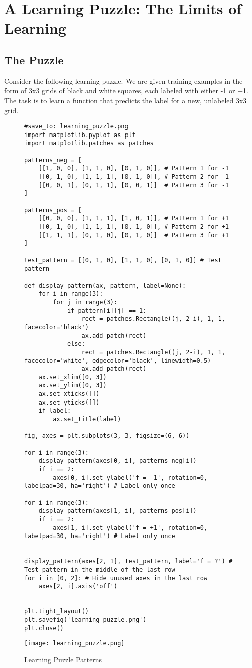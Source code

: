 \documentclass{article}
\begin{document}
\section{A Learning Puzzle: The Limits of Learning}
\subsection{The Puzzle}
Consider the following learning puzzle. We are given training examples in the form of 3x3 grids of black and white squares, each labeled with either -1 or +1. The task is to learn a function that predicts the label for a new, unlabeled 3x3 grid.

\begin{figure}[H]
    \centering
    \begin{verbatim}
#save_to: learning_puzzle.png
import matplotlib.pyplot as plt
import matplotlib.patches as patches

patterns_neg = [
    [[1, 0, 0], [1, 1, 0], [0, 1, 0]], # Pattern 1 for -1
    [[0, 1, 0], [1, 1, 1], [0, 1, 0]], # Pattern 2 for -1
    [[0, 0, 1], [0, 1, 1], [0, 0, 1]]  # Pattern 3 for -1
]

patterns_pos = [
    [[0, 0, 0], [1, 1, 1], [1, 0, 1]], # Pattern 1 for +1
    [[0, 1, 0], [1, 1, 1], [0, 1, 0]], # Pattern 2 for +1
    [[1, 1, 1], [0, 1, 0], [0, 1, 0]]  # Pattern 3 for +1
]

test_pattern = [[0, 1, 0], [1, 1, 0], [0, 1, 0]] # Test pattern

def display_pattern(ax, pattern, label=None):
    for i in range(3):
        for j in range(3):
            if pattern[i][j] == 1:
                rect = patches.Rectangle((j, 2-i), 1, 1, facecolor='black')
                ax.add_patch(rect)
            else:
                rect = patches.Rectangle((j, 2-i), 1, 1, facecolor='white', edgecolor='black', linewidth=0.5)
                ax.add_patch(rect)
    ax.set_xlim([0, 3])
    ax.set_ylim([0, 3])
    ax.set_xticks([])
    ax.set_yticks([])
    if label:
        ax.set_title(label)

fig, axes = plt.subplots(3, 3, figsize=(6, 6))

for i in range(3):
    display_pattern(axes[0, i], patterns_neg[i])
    if i == 2:
        axes[0, i].set_ylabel('f = -1', rotation=0, labelpad=30, ha='right') # Label only once

for i in range(3):
    display_pattern(axes[1, i], patterns_pos[i])
    if i == 2:
        axes[1, i].set_ylabel('f = +1', rotation=0, labelpad=30, ha='right') # Label only once


display_pattern(axes[2, 1], test_pattern, label='f = ?') # Test pattern in the middle of the last row
for i in [0, 2]: # Hide unused axes in the last row
    axes[2, i].axis('off')


plt.tight_layout()
plt.savefig('learning_puzzle.png')
plt.close()
    \end{verbatim}
    \texttt{[image: learning\_puzzle.png]}
    \caption{Learning Puzzle Patterns}
    \label{fig:learning_puzzle}
\end{figure}
\end{document}
